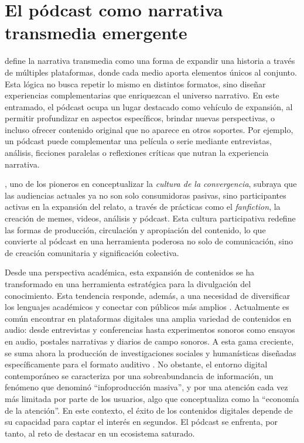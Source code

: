 \documentclass[
  spanish,
  11pt,
  a4paper,
]{scrbook}
\begin{document}
\section*{El pódcast como narrativa transmedia
emergente}\label{el-puxf3dcast-como-narrativa-transmedia-emergente}


\textcite{Scolari2013} define la narrativa transmedia como una forma de
expandir una historia a través de múltiples plataformas, donde cada
medio aporta elementos únicos al conjunto. Esta lógica no busca repetir
lo mismo en distintos formatos, sino diseñar experiencias
complementarias que enriquezcan el universo narrativo. En este
entramado, el pódcast ocupa un lugar destacado como vehículo de
expansión, al permitir profundizar en aspectos específicos, brindar
nuevas perspectivas, o incluso ofrecer contenido original que no aparece
en otros soportes. Por ejemplo, un pódcast puede complementar una
película o serie mediante entrevistas, análisis, ficciones paralelas o
reflexiones críticas que nutran la experiencia narrativa.

\textcite{Jenkins2008}, uno de los pioneros en conceptualizar la
\emph{cultura de la convergencia}, subraya que las audiencias actuales
ya no son solo consumidoras pasivas, sino participantes activas en la
expansión del relato, a través de prácticas como el \emph{fanfiction},
la creación de memes, videos, análisis y pódcast. Esta cultura
participativa redefine las formas de producción, circulación y
apropiación del contenido, lo que convierte al pódcast en una
herramienta poderosa no solo de comunicación, sino de creación
comunitaria y significación colectiva.

Desde una perspectiva académica, esta expansión de contenidos se ha
transformado en una herramienta estratégica para la divulgación del
conocimiento. Esta tendencia responde, además, a una necesidad de
diversificar los lenguajes académicos y conectar con públicos más
amplios \autocite{Olivieri2022}. Actualmente es común encontrar en
plataformas digitales una amplia variedad de contenidos en audio: desde
entrevistas y conferencias hasta experimentos sonoros como ensayos en
audio, postales narrativas y diarios de campo sonoros. A esta gama
creciente, se suma ahora la producción de investigaciones sociales y
humanísticas diseñadas específicamente para el formato auditivo
\autocite{BeltranNieves2024}. No obstante, el entorno digital
contemporáneo se caracteriza por una sobreabundancia de información, un
fenómeno que \textcite{Levy1999} denominó ``infoproducción masiva'', y
por una atención cada vez más limitada por parte de los usuarios, algo
que \textcite{Franck2019} conceptualiza como la ``economía de la
atención''. En este contexto, el éxito de los contenidos digitales
depende de su capacidad para captar el interés en segundos. El pódcast
se enfrenta, por tanto, al reto de destacar en un ecosistema saturado.
\end{document}
